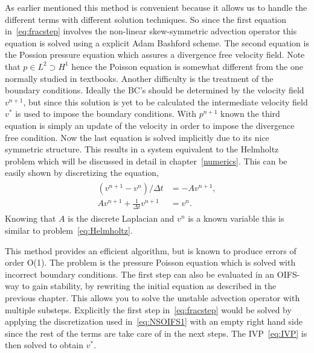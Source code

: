 As earlier mentioned this method is convenient because it allows us to handle the different 
terms with different solution techniques. So since the first equation in~\ref{eq:fracstep}
involves the non-linear skew-symmetric advection operator this equation is solved using a 
explicit Adam Bashford scheme. The second equation is the Possion pressure equation which
assures a divergence free velocity field. Note that $p\in L^2\supset H^1$ hence the Poisson equation 
is somewhat different from the one normally studied in textbooks. Another difficulty is the 
treatment of the boundary conditions. Ideally the BC's should be determined by the velocity 
field $v^{n+1}$, but since this solution is yet to be calculated the intermediate velocity field 
$v^{*}$ is used to impose the boundary conditions. With $p^{n+1}$ known the third equation is 
simply an update of the velocity in order to impose the divergence free condition. Now the last
equation is solved implicitly due to its nice symmetric structure. This results in a system 
equivalent to the Helmholtz problem which will be discussed in detail in chapter~\ref{numerics}.
This can be easily shown by discretizing the equation, 
\begin{align}
    \begin{split}
    (v^{n+1}-v^{n})/\Delta t  &= -Av^{n+1},\\
    Av^{n+1}+\frac{1}{\Delta t} v^{n+1} &= v^{n}.
    \end{split}
    \label{eq:fracHelm}
\end{align}
Knowing that $A$ is the discrete Laplacian and $v^n$ is a known variable this is 
similar to problem~\ref{eq:Helmholtz}.


This method provides an efficient algorithm, but is known to produce errors of order O(1).
The problem is the pressure Poisson equation which is solved with incorrect boundary 
conditions. The first step can also be evaluated in an OIFS-way to gain stability,
by rewriting the initial equation as described in the previous chapter. This allows you 
to solve the unstable advection operator with multiple substeps. Explicitly the first step 
in~\ref{eq:fracstep} would be solved by applying the discretization used in~\ref{eq:NSOIFS1}
with an empty right hand side since the rest of the terms are take care of in the next steps. 
The IVP~\ref{eq:IVP} is then solved to obtain $v^{*}$.


